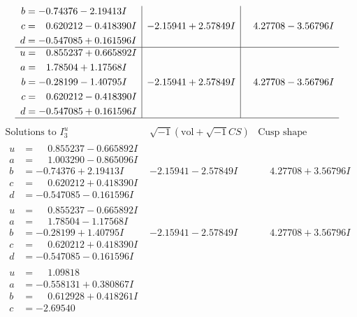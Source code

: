 \documentclass[1p]{elsarticle_modified}
\theoremstyle{definition}
\newcommand{\I}{\sqrt{-1}}
\begin{document}
$$\begin{array}{c|c|c}
\begin{aligned}
b &= -0.74376 - 2.19413 I \\
c &= \phantom{-}0.620212 - 0.418390 I \\
d &= -0.547085 + 0.161596 I\end{aligned}
 & -2.15941 + 2.57849 I & \phantom{-}4.27708 - 3.56796 I \\ \hline\begin{aligned}
u &= \phantom{-}0.855237 + 0.665892 I \\
a &= \phantom{-}1.78504 + 1.17568 I \\
b &= -0.28199 - 1.40795 I \\
c &= \phantom{-}0.620212 - 0.418390 I \\
d &= -0.547085 + 0.161596 I\end{aligned}
 & -2.15941 + 2.57849 I & \phantom{-}4.27708 - 3.56796 I\\
 \hline 
 \end{array}$$\newpage$$\begin{array}{c|c|c}  
\text{Solutions to }I^u_{3}& \I (\text{vol} + \sqrt{-1}CS) & \text{Cusp shape}\\
 \hline 
\begin{aligned}
u &= \phantom{-}0.855237 - 0.665892 I \\
a &= \phantom{-}1.003290 - 0.865096 I \\
b &= -0.74376 + 2.19413 I \\
c &= \phantom{-}0.620212 + 0.418390 I \\
d &= -0.547085 - 0.161596 I\end{aligned}
 & -2.15941 - 2.57849 I & \phantom{-}4.27708 + 3.56796 I \\ \hline\begin{aligned}
u &= \phantom{-}0.855237 - 0.665892 I \\
a &= \phantom{-}1.78504 - 1.17568 I \\
b &= -0.28199 + 1.40795 I \\
c &= \phantom{-}0.620212 + 0.418390 I \\
d &= -0.547085 - 0.161596 I\end{aligned}
 & -2.15941 - 2.57849 I & \phantom{-}4.27708 + 3.56796 I \\ \hline\begin{aligned}
u &= \phantom{-}1.09818\phantom{ +0.000000I} \\
a &= -0.558131 + 0.380867 I \\
b &= \phantom{-}0.612928 + 0.418261 I \\
c &= -2.69540\phantom{ +0.000000I} \\

\end{aligned}
\end{array}$$
\end{document}
